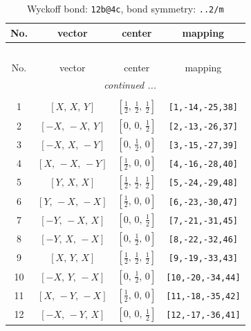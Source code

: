 \documentclass[fleqn,8pt]{jsarticle}
\begin{document}
\renewcommand{\arraystretch}{1.2}
\begin{longtable}{cccc}
\caption{Wyckoff bond: {\tt 12b@4c}, bond symmetry: {\tt ..2/m}}
 \\
 \hline \hline
No. & vector & center & mapping \\ \hline \endfirsthead

\multicolumn{3}{l}{\tablename\ \thetable{}} \\
 \hline \hline
No. & vector & center & mapping \\ \hline \endhead

 \hline \hline
\multicolumn{3}{r}{\footnotesize\it continued ...} \\ \endfoot

 \hline \hline
\multicolumn{3}{r}{} \\ \endlastfoot

1 & $\left[ X,\, X,\, Y \right]$ & $\left[ \frac{1}{2},\, \frac{1}{2},\, \frac{1}{2} \right]$ & {\tt [1,-14,-25,38]} \\ \hline
2 & $\left[ - X,\, - X,\, Y \right]$ & $\left[ 0,\, 0,\, \frac{1}{2} \right]$ & {\tt [2,-13,-26,37]} \\ \hline
3 & $\left[ - X,\, X,\, - Y \right]$ & $\left[ 0,\, \frac{1}{2},\, 0 \right]$ & {\tt [3,-15,-27,39]} \\ \hline
4 & $\left[ X,\, - X,\, - Y \right]$ & $\left[ \frac{1}{2},\, 0,\, 0 \right]$ & {\tt [4,-16,-28,40]} \\ \hline
5 & $\left[ Y,\, X,\, X \right]$ & $\left[ \frac{1}{2},\, \frac{1}{2},\, \frac{1}{2} \right]$ & {\tt [5,-24,-29,48]} \\ \hline
6 & $\left[ Y,\, - X,\, - X \right]$ & $\left[ \frac{1}{2},\, 0,\, 0 \right]$ & {\tt [6,-23,-30,47]} \\ \hline
7 & $\left[ - Y,\, - X,\, X \right]$ & $\left[ 0,\, 0,\, \frac{1}{2} \right]$ & {\tt [7,-21,-31,45]} \\ \hline
8 & $\left[ - Y,\, X,\, - X \right]$ & $\left[ 0,\, \frac{1}{2},\, 0 \right]$ & {\tt [8,-22,-32,46]} \\ \hline
9 & $\left[ X,\, Y,\, X \right]$ & $\left[ \frac{1}{2},\, \frac{1}{2},\, \frac{1}{2} \right]$ & {\tt [9,-19,-33,43]} \\ \hline
10 & $\left[ - X,\, Y,\, - X \right]$ & $\left[ 0,\, \frac{1}{2},\, 0 \right]$ & {\tt [10,-20,-34,44]} \\ \hline
11 & $\left[ X,\, - Y,\, - X \right]$ & $\left[ \frac{1}{2},\, 0,\, 0 \right]$ & {\tt [11,-18,-35,42]} \\ \hline
12 & $\left[ - X,\, - Y,\, X \right]$ & $\left[ 0,\, 0,\, \frac{1}{2} \right]$ & {\tt [12,-17,-36,41]} \\
\end{longtable}
\end{document}
